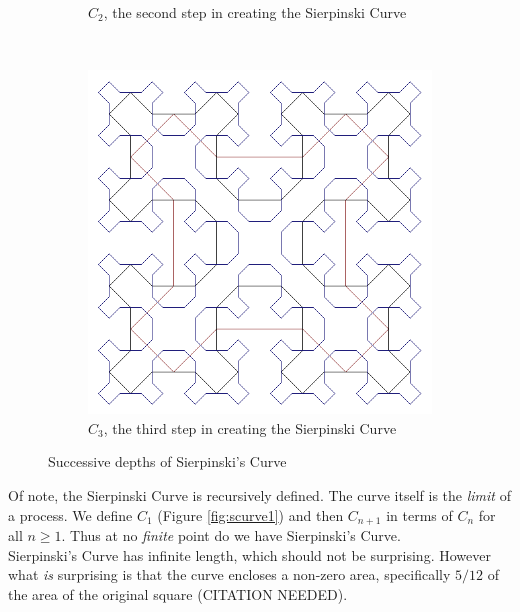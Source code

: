 \documentclass[11pt,oneside,final]{article}
\begin{document}
\begin{figure}[hb]
\begin{subfigure}[b]{0.3\textwidth}
		\caption{\(C_2\), the second step in creating the Sierpinski Curve}
		\label{fig:scurve2}
	\end{subfigure}
	~
	\begin{subfigure}[b]{0.3\textwidth}
		\includegraphics[width=\textwidth]{Sierpinski-Curve-3}
		\caption{\(C_3\), the third step in creating the Sierpinski Curve}
		\label{fig:scurve3}
	\end{subfigure}
	\caption{Successive depths of Sierpinski's Curve}\label{fig:scurve}
\end{figure}

Of note, the Sierpinski Curve is recursively defined. The curve itself is the
{\em limit} of a process. We define \(C_1\) (Figure \ref{fig:scurve1}) and then
\(C_{n+1}\) in terms of \(C_n\) for all \(n \geq 1\). Thus at no {\em finite}
point do we have Sierpinski's Curve.\\

Sierpinski's Curve has infinite length, which should not be surprising. However
what {\em is} surprising is that the curve encloses a non-zero area, specifically
\(5/12\) of the area of the original square (CITATION NEEDED).\\
\end{document}
